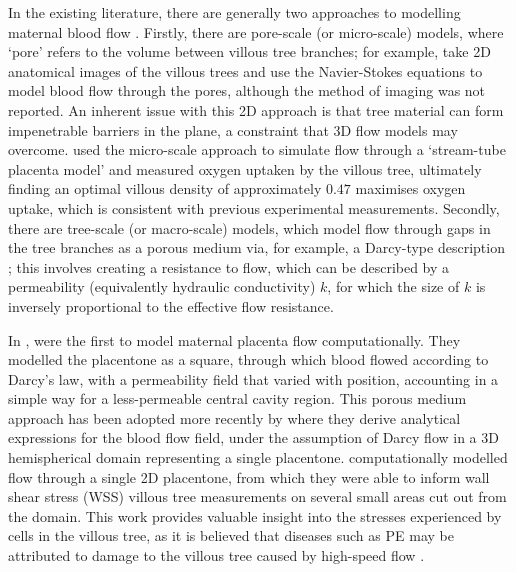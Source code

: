         In the existing literature, there are generally two approaches to modelling maternal blood flow \cite{jensenBloodFlowTransport2019}. Firstly, there are pore-scale (or micro-scale) models, where `pore' refers to the volume between villous tree branches; for example, \citeauthor{lecarpentierComputationalFluidDynamic2016} \cite{lecarpentierComputationalFluidDynamic2016} take 2D anatomical images of the villous trees and use the Navier-Stokes equations to model blood flow through the pores, although the method of imaging was not reported. An inherent issue with this 2D approach is that tree material can form impenetrable barriers in the plane, a constraint that 3D flow models may overcome. \citeauthor{serovOptimalVilliDensity2015} \cite{serovOptimalVilliDensity2015} used the micro-scale approach to simulate flow through a `stream-tube placenta model' and measured oxygen uptaken by the villous tree, ultimately finding an optimal villous density of approximately $0.47$ maximises oxygen uptake, which is consistent with previous experimental measurements. Secondly, there are tree-scale (or macro-scale) models, which model flow through gaps in the tree branches as a porous medium via, for example, a Darcy-type description \cite{lecarpentierComputationalFluidDynamic2016,chernyavskyMathematicalModelIntervillous2010,erianMaternalPlacentalBlood1977}; this involves creating a resistance to flow, which can be described by a permeability (equivalently hydraulic conductivity) $k$, for which the size of $k$ is inversely proportional to the effective flow resistance.

        In \citeyear{erianMaternalPlacentalBlood1977}, \citeauthor{erianMaternalPlacentalBlood1977} \cite{erianMaternalPlacentalBlood1977} were the first to model maternal placenta flow computationally. They modelled the placentone as a square, through which blood flowed according to Darcy's law, with a permeability field that varied with position, accounting in a simple way for a less-permeable central cavity region. This porous medium approach has been adopted more recently by \citeauthor{chernyavskyMathematicalModelIntervillous2010} \cite{chernyavskyMathematicalModelIntervillous2010} where they derive analytical expressions for the blood flow field, under the assumption of Darcy flow in a 3D hemispherical domain representing a single placentone. \citeauthor{lecarpentierComputationalFluidDynamic2016} \cite{lecarpentierComputationalFluidDynamic2016} computationally modelled flow through a single 2D placentone, from which they were able to inform wall shear stress (WSS) villous tree measurements on several small areas cut out from the domain. This work provides valuable insight into the stresses experienced by cells in the villous tree, as it is believed that diseases such as PE may be attributed to damage to the villous tree caused by high-speed flow \cite{burtonRheologicalPhysiologicalConsequences2009}.

